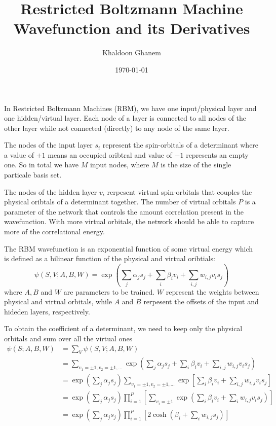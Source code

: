 \documentclass[a4paper]{article}
\title{Restricted Boltzmann Machine Wavefunction and its Derivatives}
\author{Khaldoon Ghanem}
\date{\today}
\begin{document}
\maketitle
In Restricted Boltzmann Machines (RBM), we have one input/physical layer and one hidden/virtual layer. 
Each node of a layer is connected to all nodes of the other layer while not connected (directly) to any node of the same layer.

The nodes of the input layer $s_i$ represent the spin-orbitals of a determinant where a value of $+1$ means an occupied oribtral and value of 
$-1$ represents an empty one. So in total we have $M$ input nodes, where $M$ is the size of the single particale basis set.

The nodes of the hidden layer $v_i$ rerpesent virtual spin-orbitals that couples the physical oribtals of a determinant together. 
The number of virtual orbitals $P$ is a parameter of the network that controls the amount correlation present in the wavefunction.
With more virtual orbitals, the network should be able to capture more of the correlational energy.

The RBM wavefunction is an exponential function of some virtual energy which is defined as a bilinear function of the physical and virtual oribtials:
\begin{equation*}
    \psi(S, V ; A, B, W) = \exp \left ( \sum_j \alpha_j s_j + \sum_i \beta_i v_i + \sum_{i,j} w_{i,j} v_i s_j \right)
\end{equation*}
where $A, B$ and $W$ are parameters to be trained.
$W$ represent the weights between physical and virtual orbitals, 
while $A$ and $B$ rerpesent the offsets of the input and hideden layers, respectively.

To obtain the coefficient of a determinant, we need to keep only the physical orbitals and sum over all the virtual ones
\begin{align*}
    \psi(S; A, B, W) &= \sum_V \psi(S, V ; A, B, W) \\
                     &= \sum_{v_1=\pm1,v_2=\pm1,...} \exp \left ( \sum_j \alpha_j s_j + \sum_i \beta_i v_i + \sum_{i,j} w_{i,j} v_i s_j \right)\\
                     &= \exp \left (\sum_j \alpha_j s_j \right) \sum_{v_1=\pm1,v_2=\pm1,...}\exp \left [ \sum_i \beta_i v_i + \sum_{i,j} w_{i,j} v_i s_j \right]\\
                     &= \exp \left (\sum_j \alpha_j s_j \right) \prod_{i=1}^P \left [ \sum_{v_i=\pm1}\exp \left ( \sum_i \beta_i v_i + \sum_{i} w_{i,j} v_i s_j \right)\right]\\
                     &= \exp \left (\sum_j \alpha_j s_j \right) \prod_{i=1}^P \left [ 2 \cosh \left ( \beta_i + \sum_{i} w_{i,j} s_j \right)\right]
\end{align*}
\end{document}
